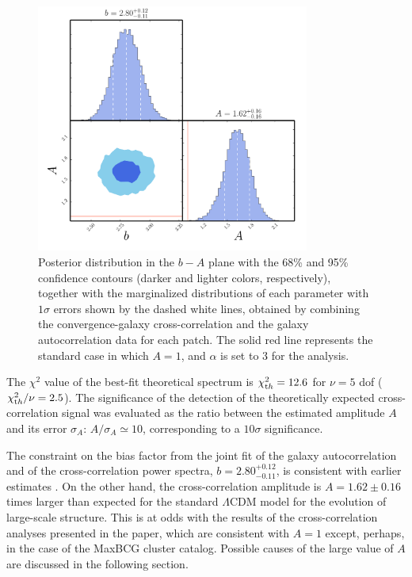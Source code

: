 \begin{figure} %
\centering %
\includegraphics[width=0.8\textwidth]{Chapter3/Images/f14}
\caption{Posterior distribution in the $b-A$ plane with the 68\% and 95\% confidence contours (darker and lighter colors, respectively), together with the marginalized distributions of each parameter with $1\sigma$ errors shown by the dashed white lines, obtained by combining the convergence-galaxy cross-correlation and the galaxy autocorrelation data for each patch. The solid red line represents the standard case in which $A=1$, and $\alpha$ is set to 3 for the analysis. \label{fig:kg_gg_pdf}}
\end{figure}

The $\chi^2$ value of the best-fit theoretical spectrum is $\chi^2_{\rm th} = 12.6$ for $\nu=5$ dof  ($\chi^2_{\rm th}/\nu = 2.5$). The significance of the detection of the theoretically expected cross-correlation signal was  evaluated as the ratio between the estimated amplitude $A$ and its error $\sigma_A$: $A/\sigma_A \simeq 10$, corresponding to a $10\sigma$ significance.

The constraint on the bias factor from the joint fit of the galaxy autocorrelation and of the cross-correlation power spectra, $b=2.80^{+0.12}_{-0.11}$, is consistent with earlier estimates \citep{Xia2012}. On the other hand, the cross-correlation amplitude is $A=1.62\pm 0.16$ times larger than expected for the standard $\Lambda$CDM model for the evolution of large-scale structure. This is at odds with the results of the cross-correlation analyses presented in the \cite{Ade2014c} paper, which are consistent with $A=1$ except, perhaps, in the case of the MaxBCG cluster catalog. Possible causes of the large value of $A$ are discussed in the following section.

